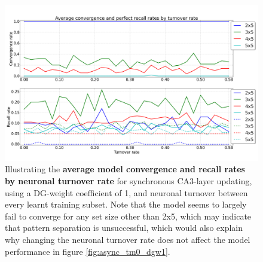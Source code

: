 \begin{figure}
    \centering
    \includegraphics[width=13cm]{fig/turnover_rates/sync_tm0_dgw1}
    \caption{Illustrating the \textbf{average model convergence and recall rates by neuronal turnover rate} for synchronous CA3-layer updating, using a DG-weight coefficient of 1, and neuronal turnover between every learnt training subset. Note that the model seems to largely fail to converge for any set size other than 2x5, which may indicate that pattern separation is unsuccessful, which would also explain why changing the neuronal turnover rate does not affect the model performance in figure \ref{fig:async_tm0_dgw1}.}
    \label{fig:sync_tm0_dgw1}
\end{figure}

